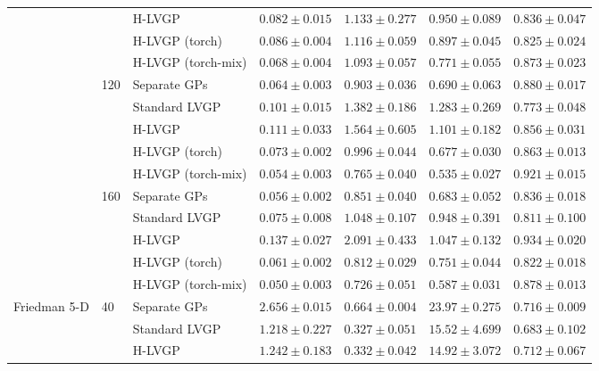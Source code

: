 \begin{table}[htbp]
\begin{tabular}{lllrrrr}
 &  & H-LVGP & $0.082 \pm 0.015$ & $1.133 \pm 0.277$ & $0.950 \pm 0.089$ & $0.836 \pm 0.047$ \\
 &  & H-LVGP (torch) & $0.086 \pm 0.004$ & $1.116 \pm 0.059$ & $0.897 \pm 0.045$ & $0.825 \pm 0.024$ \\
 &  & H-LVGP (torch-mix) & \colorbox{green!20}{\boldmath$0.068 \pm 0.004$} & $1.093 \pm 0.057$ & $0.771 \pm 0.055$ & \colorbox{green!20}{\boldmath$0.873 \pm 0.023$} \\
\cmidrule(lr){2-7}
 & \multirow{5}{*}{120} & Separate GPs & $0.064 \pm 0.003$ & $0.903 \pm 0.036$ & $0.690 \pm 0.063$ & $0.880 \pm 0.017$ \\
 &  & Standard LVGP & $0.101 \pm 0.015$ & $1.382 \pm 0.186$ & $1.283 \pm 0.269$ & $0.773 \pm 0.048$ \\
 &  & H-LVGP & $0.111 \pm 0.033$ & $1.564 \pm 0.605$ & $1.101 \pm 0.182$ & $0.856 \pm 0.031$ \\
 &  & H-LVGP (torch) & $0.073 \pm 0.002$ & $0.996 \pm 0.044$ & $0.677 \pm 0.030$ & $0.863 \pm 0.013$ \\
 &  & H-LVGP (torch-mix) & \colorbox{green!20}{\boldmath$0.054 \pm 0.003$} & \colorbox{green!20}{\boldmath$0.765 \pm 0.040$} & \colorbox{green!20}{\boldmath$0.535 \pm 0.027$} & \colorbox{green!20}{\boldmath$0.921 \pm 0.015$} \\
\cmidrule(lr){2-7}
 & \multirow{5}{*}{160} & Separate GPs & $0.056 \pm 0.002$ & $0.851 \pm 0.040$ & $0.683 \pm 0.052$ & $0.836 \pm 0.018$ \\
 &  & Standard LVGP & $0.075 \pm 0.008$ & $1.048 \pm 0.107$ & $0.948 \pm 0.391$ & $0.811 \pm 0.100$ \\
 &  & H-LVGP & $0.137 \pm 0.027$ & $2.091 \pm 0.433$ & $1.047 \pm 0.132$ & \colorbox{green!20}{\boldmath$0.934 \pm 0.020$} \\
 &  & H-LVGP (torch) & $0.061 \pm 0.002$ & $0.812 \pm 0.029$ & $0.751 \pm 0.044$ & $0.822 \pm 0.018$ \\
 &  & H-LVGP (torch-mix) & \colorbox{green!20}{\boldmath$0.050 \pm 0.003$} & \colorbox{green!20}{\boldmath$0.726 \pm 0.051$} & \colorbox{green!20}{\boldmath$0.587 \pm 0.031$} & $0.878 \pm 0.013$ \\
\midrule
\multirow{15}{*}{Friedman 5-D} & \multirow{5}{*}{40} & Separate GPs & $2.656 \pm 0.015$ & $0.664 \pm 0.004$ & $23.97 \pm 0.275$ & $0.716 \pm 0.009$ \\
 &  & Standard LVGP & $1.218 \pm 0.227$ & $0.327 \pm 0.051$ & $15.52 \pm 4.699$ & $0.683 \pm 0.102$ \\
 &  & H-LVGP & $1.242 \pm 0.183$ & $0.332 \pm 0.042$ & $14.92 \pm 3.072$ & $0.712 \pm 0.067$ \\

\end{tabular}
\end{table}
